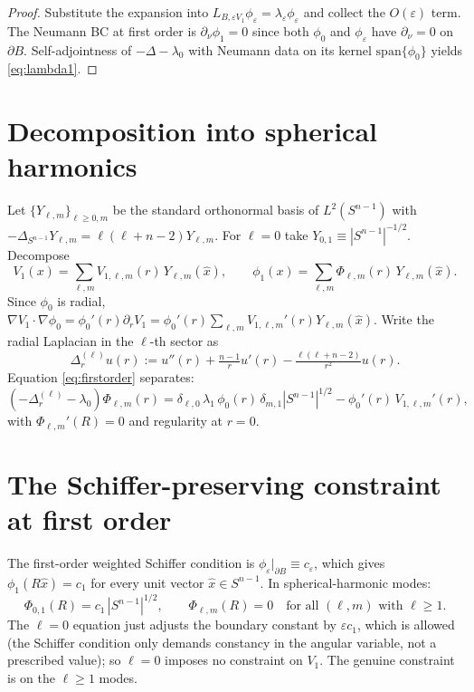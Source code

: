 \documentclass[11pt]{article}
\newcommand{\eps}{\varepsilon}
\newcommand{\1}{\mathbf 1}
\newcommand{\nor}{\partial_\nu}
\begin{document}
\begin{proof}
Substitute the expansion into $L_{B,\eps V_1}\phi_\eps=\lambda_\eps\phi_\eps$
and collect the $O(\eps)$ term. The Neumann BC at first order is
$\nor\phi_1=0$ since both $\phi_0$ and $\phi_\eps$ have $\nor=0$ on
$\partial B$. Self-adjointness of $-\Delta-\lambda_0$ with Neumann data
on its kernel $\mathrm{span}\{\phi_0\}$ yields \eqref{eq:lambda1}.
\end{proof}

\section{Decomposition into spherical harmonics}

Let $\{Y_{\ell,m}\}_{\ell\ge 0,m}$ be the standard orthonormal basis
of $L^2(S^{n-1})$ with $-\Delta_{S^{n-1}}Y_{\ell,m}=\ell(\ell+n-2)Y_{\ell,m}$.
For $\ell=0$ take $Y_{0,1}\equiv |S^{n-1}|^{-1/2}$.
Decompose
\[
    V_1(x)=\sum_{\ell,m}V_{1,\ell,m}(r)\,Y_{\ell,m}(\hat x),\qquad
    \phi_1(x)=\sum_{\ell,m}\Phi_{\ell,m}(r)\,Y_{\ell,m}(\hat x).
\]
Since $\phi_0$ is radial, $\nabla V_1\cdot\nabla\phi_0=\phi_0'(r)\partial_r V_1
=\phi_0'(r)\sum_{\ell,m}V_{1,\ell,m}'(r)Y_{\ell,m}(\hat x)$.
Write the radial Laplacian in the $\ell$-th sector as
\[
    \Delta_r^{(\ell)}u(r):=u''(r)+\tfrac{n-1}{r}u'(r)
        -\tfrac{\ell(\ell+n-2)}{r^2}u(r).
\]
Equation \eqref{eq:firstorder} separates:
\begin{equation}\label{eq:ellsector}
    (-\Delta_r^{(\ell)}-\lambda_0)\Phi_{\ell,m}(r)
    =\delta_{\ell,0}\,\lambda_1\,\phi_0(r)\,\delta_{m,1}|S^{n-1}|^{1/2}
        -\phi_0'(r)\,V_{1,\ell,m}'(r),
\end{equation}
with $\Phi_{\ell,m}'(R)=0$ and regularity at $r=0$.

\section{The Schiffer-preserving constraint at first order}

The first-order weighted Schiffer condition is
$\phi_\eps|_{\partial B}\equiv c_\eps$, which gives $\phi_1(R\hat x)=c_1$
for every unit vector $\hat x\in S^{n-1}$. In spherical-harmonic
modes:
\begin{equation}\label{eq:schifferconstraint}
    \Phi_{0,1}(R)=c_1\,|S^{n-1}|^{1/2},\qquad
    \Phi_{\ell,m}(R)=0\quad\text{for all }(\ell,m)\text{ with }\ell\ge 1.
\end{equation}
The $\ell=0$ equation just adjusts the boundary constant by $\eps c_1$,
which is allowed (the Schiffer condition only demands constancy in
the angular variable, not a prescribed value); so $\ell=0$ imposes no
constraint on $V_1$. The genuine constraint is on the $\ell\ge 1$
modes.
\end{document}

